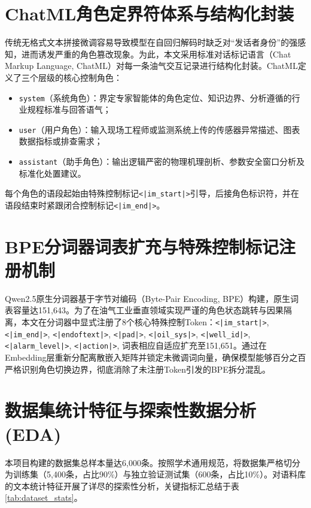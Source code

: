 \documentclass[UTF8,a4paper,zihao=-4,openany,twoside]{ctexbook}
\begin{document}
\section{ChatML角色定界符体系与结构化封装}
传统无格式文本拼接微调容易导致模型在自回归解码时缺乏对“发话者身份”的强感知，进而诱发严重的角色篡改现象。为此，本文采用标准对话标记语言（Chat Markup Language, ChatML）对每一条油气交互记录进行结构化封装。ChatML定义了三个层级的核心控制角色：
\begin{itemize}
    \item \texttt{system}（系统角色）：界定专家智能体的角色定位、知识边界、分析遵循的行业规程标准与回答语气；
    \item \texttt{user}（用户角色）：输入现场工程师或监测系统上传的传感器异常描述、图表数据指标或排查需求；
    \item \texttt{assistant}（助手角色）：输出逻辑严密的物理机理剖析、参数安全窗口分析及标准化处置建议。
\end{itemize}
每个角色的语段起始由特殊控制标记\texttt{<|im\_start|>}引导，后接角色标识符，并在语段结束时紧跟闭合控制标记\texttt{<|im\_end|>}\cite{chiang2023vicuna}。


\section{BPE分词器词表扩充与特殊控制标记注册机制}
Qwen2.5原生分词器基于字节对编码（Byte-Pair Encoding, BPE）构建，原生词表容量达151,643。为了在油气工业垂直领域实现严谨的角色状态跳转与因果隔离，本文在分词器中显式注册了8个核心特殊控制Token：\texttt{<|im\_start|>}, \texttt{<|im\_end|>}, \texttt{<|endoftext|>}, \texttt{<|pad|>}, \texttt{<|oil\_sys|>}, \texttt{<|well\_id|>}, \texttt{<|alarm\_level|>}, \texttt{<|action|>}, 词表相应自适应扩充至151,651。通过在Embedding层重新分配离散嵌入矩阵并锁定未微调词向量，确保模型能够百分之百严格识别角色切换边界，彻底消除了未注册Token引发的BPE拆分混乱。

\section{数据集统计特征与探索性数据分析 (EDA)}
本项目构建的数据集总样本量达6,000条。按照学术通用规范，将数据集严格切分为训练集（5,400条，占比90\%）与独立验证测试集（600条，占比10\%）。对语料库的文本统计特征开展了详尽的探索性分析，关键指标汇总结于表\ref{tab:dataset_stats}。
\end{document}
